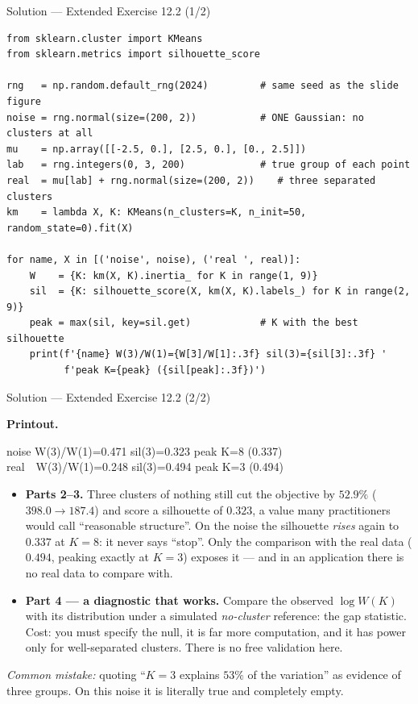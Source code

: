 \documentclass[aspectratio=169,11pt]{beamer}
\begin{document}
\begin{frame}[fragile]{Solution --- Extended Exercise 12.2 (1/2)}
\begin{solutionbox}
\begin{lstlisting}[basicstyle=\ttfamily\scriptsize]
from sklearn.cluster import KMeans
from sklearn.metrics import silhouette_score

rng   = np.random.default_rng(2024)         # same seed as the slide figure
noise = rng.normal(size=(200, 2))           # ONE Gaussian: no clusters at all
mu    = np.array([[-2.5, 0.], [2.5, 0.], [0., 2.5]])
lab   = rng.integers(0, 3, 200)             # true group of each point
real  = mu[lab] + rng.normal(size=(200, 2))    # three separated clusters
km    = lambda X, K: KMeans(n_clusters=K, n_init=50, random_state=0).fit(X)

for name, X in [('noise', noise), ('real ', real)]:
    W    = {K: km(X, K).inertia_ for K in range(1, 9)}
    sil  = {K: silhouette_score(X, km(X, K).labels_) for K in range(2, 9)}
    peak = max(sil, key=sil.get)            # K with the best silhouette
    print(f'{name} W(3)/W(1)={W[3]/W[1]:.3f} sil(3)={sil[3]:.3f} '
          f'peak K={peak} ({sil[peak]:.3f})')
\end{lstlisting}
\end{solutionbox}
\end{frame}

\begin{frame}{Solution --- Extended Exercise 12.2 (2/2)}
  \scriptsize
\begin{solutionbox}
  \textbf{Printout.}
  \begin{center}\ttfamily\footnotesize
  noise W(3)/W(1)=0.471 sil(3)=0.323 peak K=8 (0.337)\\[2pt]
  real\ \ W(3)/W(1)=0.248 sil(3)=0.494 peak K=3 (0.494)
  \end{center}
  \begin{itemize}
    \item \textbf{Parts 2--3.} Three clusters of nothing still cut the objective by
          $52.9\%$ ($398.0\to187.4$) and score a silhouette of $0.323$, a value many
          practitioners would call ``reasonable structure''. On the noise the silhouette
          \emph{rises} again to $0.337$ at $K=8$: it never says ``stop''. Only the
          comparison with the real data ($0.494$, peaking exactly at $K=3$) exposes it ---
          and in an application there is no real data to compare with.
    \item \textbf{Part 4 --- a diagnostic that works.} Compare the observed $\log W(K)$ with
          its distribution under a simulated \emph{no-cluster} reference: the gap statistic.
          Cost: you must specify the null, it is far more computation, and it has power only
          for well-separated clusters. There is no free validation here.
  \end{itemize}
  \smallskip
  \textit{Common mistake:} quoting ``$K=3$ explains $53\%$ of the variation'' as evidence
  of three groups. On this noise it is literally true and completely empty.
\end{solutionbox}
\end{frame}
\end{document}
